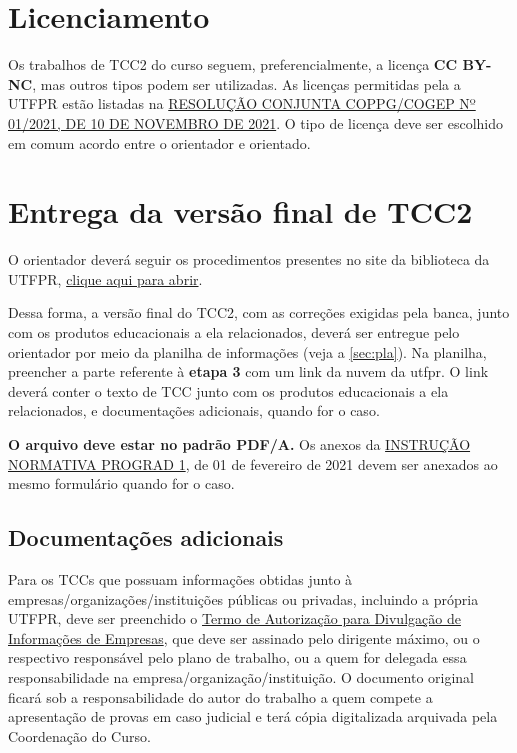 \documentclass[a4paper, 12pt]{article}
\begin{document}
	\section{Licenciamento}
	
	Os trabalhos de TCC2 do curso seguem, preferencialmente, a licença \textbf{CC BY-NC}, mas outros tipos podem ser utilizadas. As licenças permitidas pela a UTFPR estão listadas na \href{https://sei.utfpr.edu.br/sei/publicacoes/controlador_publicacoes.php?acao=publicacao_visualizar&id_documento=2615190&id_orgao_publicacao=0}{RESOLUÇÃO CONJUNTA COPPG/COGEP Nº 01/2021, DE 10 DE NOVEMBRO DE 2021}. O tipo de licença deve ser escolhido em comum acordo entre o orientador e orientado.
	
	\section{Entrega da versão final de TCC2}
	
	O orientador deverá seguir os procedimentos presentes no site da biblioteca da UTFPR, \href{http://portal.utfpr.edu.br/biblioteca/trabalhos-academicos/docentes/procedimento-de-entrega-graduacao}{clique aqui para abrir}.
	
	Dessa forma, a versão final do TCC2, com as correções exigidas pela banca, junto com os produtos educacionais a ela relacionados, deverá ser entregue pelo orientador por meio da planilha de informações (veja a \autoref{sec:pla}). Na planilha, preencher a parte referente à \textbf{etapa 3} com um link da nuvem da utfpr. O link deverá conter o texto de TCC junto com os produtos educacionais a ela relacionados, e documentações adicionais, quando for o caso.
	
	\textbf{O arquivo deve estar no padrão PDF/A.} Os anexos da \href{https://sei.utfpr.edu.br/sei/publicacoes/controlador_publicacoes.php?acao=publicacao_visualizar&id_documento=2042165&id_orgao_publicacao=0}{INSTRUÇÃO NORMATIVA PROGRAD 1}, de 01 de fevereiro de 2021 devem ser anexados ao mesmo formulário quando for o caso. 

	\subsection{Documentações adicionais}
    Para os TCCs que possuam informações obtidas junto à empresas/organizações/instituições públicas ou privadas, incluindo a própria UTFPR, deve ser preenchido o \href{https://sei.utfpr.edu.br/sei/publicacoes/controlador_publicacoes.php?acao=publicacao_visualizar&id_documento=2651593&id_orgao_publicacao=0}{Termo de Autorização para Divulgação de Informações de Empresas}, que deve ser assinado pelo dirigente máximo, ou o respectivo responsável pelo plano de trabalho, ou a quem for delegada essa responsabilidade na empresa/organização/instituição. O documento original ficará sob a responsabilidade do autor do trabalho a quem compete a apresentação de provas em caso judicial e terá cópia digitalizada arquivada pela Coordenação do Curso.
\end{document}
